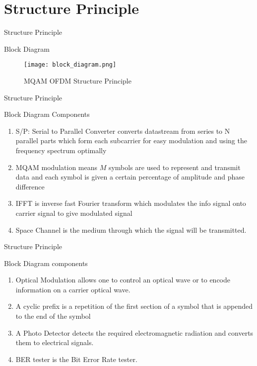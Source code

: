 \documentclass{beamer}
\begin{document}
\section{Structure Principle}
\begin{frame}{Structure Principle}
\begin{block}{Block Diagram}
\begin{figure}
    \centering
    \texttt{[image: block\_diagram.png]}
    \caption{MQAM OFDM Structure Principle}
    \label{fig:my_label}
\end{figure}
\end{block}
\end{frame}
\begin{frame}{Structure Principle}
\begin{block}{Block Diagram Components}
\begin{enumerate}

    \item S/P: Serial to Parallel Converter converts datastream from series to N parallel parts which form each subcarrier for easy modulation and using the frequency spectrum optimally
    \item MQAM modulation means $M$ symbols are used to represent and transmit data and each symbol is given a certain percentage of amplitude and phase difference
    \item IFFT is inverse fast Fourier transform which modulates the info signal onto carrier signal to give modulated signal
    \item Space Channel is the medium through which the signal will be transmitted.
    
\end{enumerate}
\end{block}

\end{frame}

\begin{frame}{Structure Principle}
\begin{block}{Block Diagram components}
\begin{enumerate}
    \item Optical Modulation allows one to control an optical wave or to encode information on a carrier optical wave.
    \item A cyclic prefix is a repetition of the first section of a symbol that is appended to the end of the symbol
        \item A Photo Detector detects the required electromagnetic radiation  and converts them to electrical signals.
        \item BER tester is the Bit Error Rate tester.
    \end{enumerate}
\end{block}
    
\end{frame}
\end{document}
